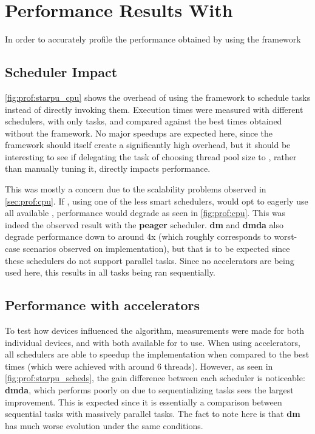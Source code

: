 \documentclass[main.tex]{subfiles}
\begin{document}
\section{Performance Results With \starpu}

In order to accurately profile the performance obtained by using the framework

\subsection{Scheduler Impact}

\cref{fig:prof:starpu_cpu} shows the overhead of using the framework to schedule tasks instead of directly invoking them. Execution times were measured with different schedulers, with only \cpu tasks, and compared against the best \cpu times obtained without the framework. No major speedups are expected here, since the framework should itself create a significantly high overhead, but it should be interesting to see if delegating the task of choosing \openmp thread pool size to \starpu, rather than manually tuning it, directly impacts performance.

This was mostly a concern due to the scalability problems observed in \cref{sec:prof:cpu}. If \starpu, using one of the less smart schedulers, would opt to eagerly use all available \cpus, performance would degrade as seen in \cref{fig:prof:cpu}. This was indeed the observed result with the \textbf{peager} scheduler. \textbf{dm} and \textbf{dmda} also degrade performance down to around 4x (which roughly corresponds to worst-case scenarios observed on \cpu implementation), but that is to be expected since these schedulers do not support parallel tasks. Since no accelerators are being used here, this results in all tasks being ran sequentially.




\subsection{Performance with accelerators}

To test how \cuda devices influenced the algorithm, measurements were made for both individual \cuda devices, and with both available \gpus for \starpu to use.
When using accelerators, all schedulers are able to speedup the implementation when compared to the best \cpu times (which were achieved with around 6 threads). However, as seen in \cref{fig:prof:starpu_scheds}, the gain difference between each scheduler is noticeable: \textbf{dmda}, which performs poorly on \cpu due to sequentializing tasks sees the largest improvement. This is expected since it is essentially a comparison between sequential \cpu tasks with massively parallel \cuda tasks. The fact to note here is that \textbf{dm} has much worse evolution under the same conditions.
\end{document}
